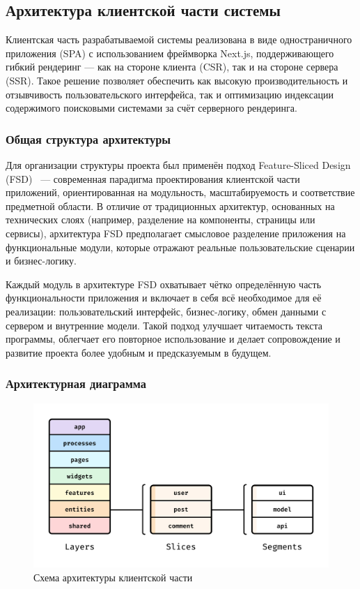 \subsection{Архитектура клиентской части системы}

Клиентская часть разрабатываемой системы реализована в виде одностраничного приложения (SPA) с использованием фреймворка Next.js, поддерживающего гибкий рендеринг — как на стороне клиента (CSR), так и на стороне сервера (SSR). Такое решение позволяет обеспечить как высокую производительность и отзывчивость пользовательского интерфейса, так и оптимизацию индексации содержимого поисковыми системами за счёт серверного рендеринга.

\subsubsection{Общая структура архитектуры}

Для организации структуры проекта был применён подход Feature-Sliced Design (FSD)~\cite{feature_sliced_design} — современная парадигма проектирования клиентской части приложений, ориентированная на модульность, масштабируемость и соответствие предметной области. В отличие от традиционных архитектур, основанных на технических слоях (например, разделение на компоненты, страницы или сервисы), архитектура FSD предполагает смысловое разделение приложения на функциональные модули, которые отражают реальные пользовательские сценарии и бизнес-логику.

Каждый модуль в архитектуре FSD охватывает чётко определённую часть функциональности приложения и включает в себя всё необходимое для её реализации: пользовательский интерфейс, бизнес-логику, обмен данными с сервером и внутренние модели. Такой подход улучшает читаемость текста программы, облегчает его повторное использование и делает сопровождение и развитие проекта более удобным и предсказуемым в будущем.

\subsubsection{Архитектурная диаграмма}

\begin{figure}[h]
  \centering
  \includegraphics[width=0.7\linewidth]{static/fsdImage}
  \caption{Схема архитектуры клиентской части}
\end{figure}

